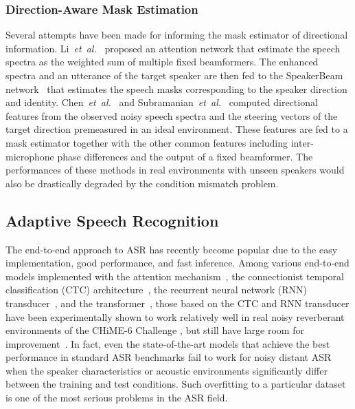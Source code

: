 \documentclass[a4paper]{article}
\newcommand{\etal}{\textit{et~al.}}
\begin{document}
\subsubsection{Direction-Aware Mask Estimation}

Several attempts have been made 
 for informing the mask estimator of directional information.
Li~\etal~\cite{Li2019} proposed an attention network 
 that estimate the speech spectra as the weighted sum of multiple fixed beamformers.
The enhanced spectra and an utterance of the target speaker
 are then fed to the SpeakerBeam network~\cite{8268910}
 that estimates the speech masks corresponding to the speaker direction and identity.
Chen~\etal~\cite{8639593} and Subramanian~\etal~\cite{subramanian_far-field_2020}
 computed directional features
 from the observed noisy speech spectra
 and the steering vectors of the target direction premeasured in an ideal environment.
These features are fed to a mask estimator
 together with the other common features 
 including inter-microphone phase differences and the output of a fixed beamformer.
The performances of these methods in real environments with unseen speakers
 would also be drastically degraded by the condition mismatch problem.

\subsection{Adaptive Speech Recognition}

The end-to-end approach to ASR
 has recently become popular
 due to the easy implementation, good performance, and fast inference.
Among various end-to-end models implemented
 with the attention mechanism~\cite{attention},
 the connectionist temporal classification (CTC) architecture~\cite{graves_connectionist_2006},
 the recurrent neural network (RNN) transducer~\cite{DBLP:journals/corr/abs-1211-3711},
 and the transformer~\cite{gulati20_interspeech},
 those based on the CTC and RNN transducer 
 have been experimentally shown to work relatively well
 in real noisy reverberant environments of the CHiME-6 Challenge \cite{watanabe20b_chime},
 but still have large room for improvement~\cite{andrusenko_towards_2020}.
In fact,
 even the state-of-the-art models 
 that achieve the best performance in standard ASR benchmarks fail to work
 for noisy distant ASR
 when the speaker characteristics or acoustic environments significantly differ
 between the training and test conditions.
Such overfitting to a particular dataset
 is one of the most serious problems in the ASR field.
\end{document}
